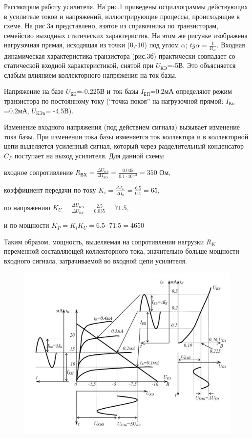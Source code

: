 Рассмотрим работу усилителя. На рис.\ref{fig:3} приведены осциллограммы действующих в усилителе токов и напряжений, иллюстрирующие процессы, происходящие в схеме. На рис.3а представлено, взятое из справочника по транзисторам, семейство выходных статических характеристик. На этом же рисунке изображена нагрузочная прямая, исходящая из точки (0,-10) под углом $\alpha$; $tg\alpha = \frac{1}{R_K}$. Входная динамическая характеристика транзистора (рис.3б) практически совпадает со статической входной характеристикой, снятой при $U_{\text{КЭ}}$=-5В. Это объясняется слабым влиянием коллекторного напряжения на ток базы.

Напряжение на базе $U_{\text{БЭ}}$=-0.225В и ток базы $I_{\text{БП}}$=0.2мА
определяют режим транзистора по постоянному току (“точка покоя” на нагрузочной прямой: $I_{\text{Кn}}$=0.2мА, $U_{\text{КЭn}}$= -4.5В).

Изменение входного напряжения (под действием сигнала) вызывает изменение тока базы. При изменении тока базы изменяется ток коллектора и в коллекторной цепи выделяется
усиленный сигнал, который через разделительный конденсатор $C_P$ поступает на выход усилителя. Для данной схемы

входное сопротивление $R_{\text{ВХ}}=\frac{\Delta U_{\text{БЭ}}}{\Delta I_{\text{БЭ}}}=\frac{0.035}{0.1\cdot10^{-3}}=350 \text{ Ом},$

коэффициент передачи по току $K_i=\frac{\Delta I_K}{\Delta I_{\text{Б}}}=\frac{6.5}{0.1}=65,$

по напряжению $K_U=\frac{\Delta U_{\text{KЭ}}}{\Delta U_{\text{БЭ}}}=\frac{2.5}{0.035}=71.5,$

и по мощности $K_P=K_i K_U=6.5\cdot 71.5=4650$

Таким образом, мощность, выделяемая на сопротивлении нагрузки $R_K$ переменной составляющей коллекторного тока, значительно больше мощности входного сигнала, затрачиваемой во входной цепи усилителя.

\begin{figure}[h]
	\centering
	\includegraphics[width=\linewidth]{fig/fig3}
	\caption{}
	\label{fig:3}
\end{figure}

